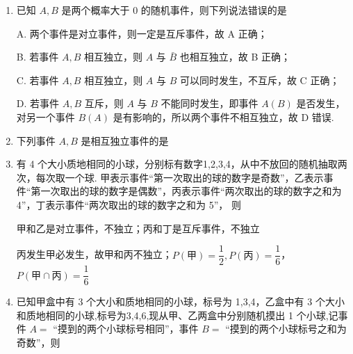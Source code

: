 \begin{enumerate}
\begin{enumerate}
        
        \item 已知 $A,B$ 是两个概率大于 0 的随机事件，则下列说法错误的是
        \begin{jieda}
            A. 两个事件是对立事件，则一定是互斥事件，故 A 正确；
            
            B. 若事件 $A,B$ 相互独立，则 $A$ 与 $\bar{B}$ 也相互独立，故 B 正确；
            
            C. 若事件 $A,B$ 相互独立，则 $A$ 与 $B$ 可以同时发生，不互斥，故 C 正确；
            
            D. 若事件 $A,B$ 互斥，则 $A$ 与 $B$ 不能同时发生，即事件 $A\left( B\right)$ 是否发生，对另一个事件 $B\left( A\right)$ 是有影响的，所以两个事件不相互独立，故 D 错误.
        \end{jieda}

        \item 下列事件 $A,B$ 是相互独立事件的是
        
        \item 有 4 个大小质地相同的小球，分别标有数字1,2,3,4，从中不放回的随机抽取两次，每次取一个球. 甲表示事件“第一次取出的球的数字是奇数”，乙表示事件“第一次取出的球的数字是偶数”，丙表示事件“两次取出的球的数字之和为 4”，丁表示事件“两次取出的球的数字之和为 5”， 则
        \begin{jieda}
            甲和乙是对立事件，不独立；丙和丁是互斥事件，不独立
            
            丙发生甲必发生，故甲和丙不独立；$P(\text{甲}) = \dfrac{1}{2}, P(\text{丙}) = \dfrac{1}{6}$，$P(\text{甲}\cap\text{丙}) = \dfrac{1}{6}$
        \end{jieda}

        \item 已知甲盒中有 3 个大小和质地相同的小球，标号为 1,3,4，乙盒中有 3 个大小和质地相同的小球,标号为3,4,6,现从甲、乙两盒中分别随机摸出 1 个小球,记事件 $A =$ “摸到的两个小球标号相同”，事件 $B =$ “摸到的两个小球标号之和为奇数”，则


\end{enumerate}
\end{enumerate}
